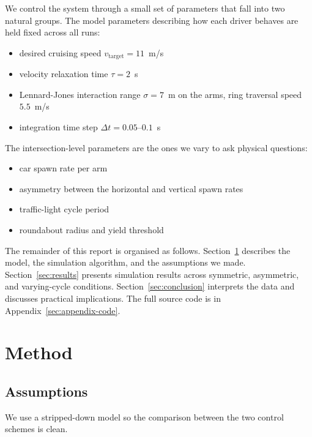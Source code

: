 \documentclass[11pt]{article}
\begin{document}
We control the system through a small set of parameters that fall into two natural groups. The model parameters describing how each driver behaves are held fixed across all runs:
\begin{itemize}
    \item desired cruising speed $v_{\text{target}} = 11$~m/s
    \item velocity relaxation time $\tau = 2$~s
    \item Lennard-Jones interaction range $\sigma = 7$~m on the arms, ring traversal speed $5.5$~m/s
    \item integration time step $\Delta t = 0.05$--$0.1$~s
\end{itemize}

The intersection-level parameters are the ones we vary to ask physical questions:
\begin{itemize}
    \item car spawn rate per arm
    \item asymmetry between the horizontal and vertical spawn rates
    \item traffic-light cycle period
    \item roundabout radius and yield threshold
\end{itemize}

The remainder of this report is organised as follows. Section~\ref{sec:method} describes the model, the simulation algorithm, and the assumptions we made. Section~\ref{sec:results} presents simulation results across symmetric, asymmetric, and varying-cycle conditions. Section~\ref{sec:conclusion} interprets the data and discusses practical implications. The full source code is in Appendix~\ref{sec:appendix-code}.

\section{Method}\label{sec:method}

\subsection{Assumptions}
We use a stripped-down model so the comparison between the two control schemes is clean.
\end{document}
